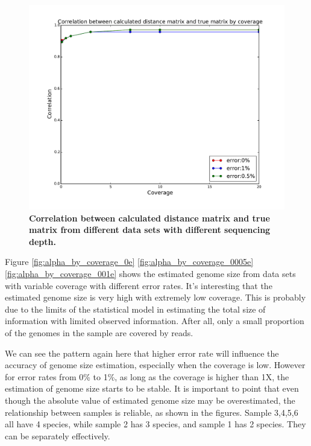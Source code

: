 \documentclass{article}
\begin{document}

\begin{figure}[!ht]
 \centerline{\includegraphics[width=6in]{./figures/beta_by_coverage.pdf}}
\caption{\bf Correlation between calculated distance matrix and true matrix
from different data sets with different sequencing depth.}
\label{fig:IGS_correlation_coverage}
\end{figure}



Figure \ref{fig:alpha_by_coverage_0e} \ref{fig:alpha_by_coverage_0005e} \ref{fig:alpha_by_coverage_001e} 
shows the estimated genome size 
from data sets with variable coverage with different error rates.
It's interesting that the estimated genome size is very high with extremely low 
coverage. This is probably due to the limits of the statistical model in estimating
the total size of information with limited observed information.
After all, only a small proportion of the genomes in the sample are covered by
reads.

We can see the pattern again here that higher error rate will influence the accuracy
of genome size estimation, especially when the coverage is low. However for error rates
from 0\% to 1\%, as long as the coverage is higher than 1X, the estimation of 
genome size starts to be stable. 
It is important to point that even though the absolute value of estimated 
genome size may be overestimated, the relationship between samples 
is reliable, as shown in the figures. Sample 3,4,5,6 all have 4 species, while 
sample 2 has 3 species, and sample 1 has 2 species. 
They can be separately effectively.
\end{document}
